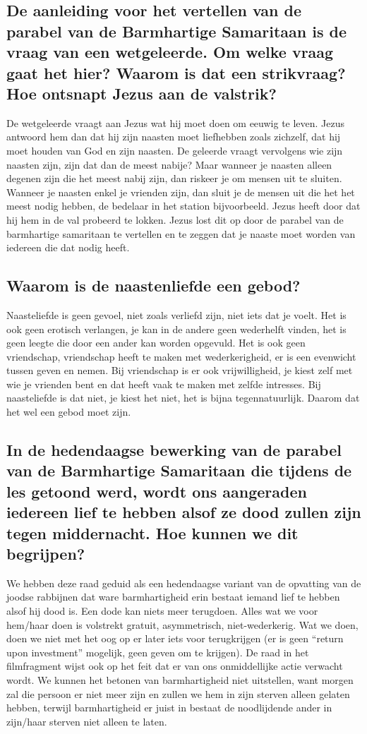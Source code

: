 \documentclass[11pt,a4paper,titlepage]{article}
\begin{document}
\subsection{De aanleiding voor het vertellen van de parabel van de Barmhartige Samaritaan is de vraag van een wetgeleerde. Om welke vraag gaat het hier? Waarom is dat een strikvraag? Hoe ontsnapt Jezus aan de valstrik?}
De wetgeleerde vraagt aan Jezus wat hij moet doen om eeuwig te leven. Jezus antwoord hem dan dat hij zijn naasten moet liefhebben zoals zichzelf, dat hij moet houden van God en zijn naasten. De geleerde vraagt vervolgens wie zijn naasten zijn, zijn dat dan de meest nabije? Maar wanneer je naasten alleen degenen zijn die het meest nabij zijn, dan riskeer je om mensen uit te sluiten. Wanneer je naasten enkel je vrienden zijn, dan sluit je de mensen uit die het het meest nodig hebben, de bedelaar in het station bijvoorbeeld. Jezus heeft door dat hij hem in de val probeerd te lokken. Jezus lost dit op door de parabel van de barmhartige samaritaan te vertellen en te zeggen dat je naaste moet worden van iedereen die dat nodig heeft.

\subsection{Waarom is de naastenliefde een gebod?}
Naasteliefde is geen gevoel, niet zoals verliefd zijn, niet iets dat je voelt. Het is ook geen erotisch verlangen, je kan in de andere geen wederhelft vinden, het is geen leegte die door een ander kan worden opgevuld. Het is ook geen vriendschap, vriendschap heeft te maken met wederkerigheid, er is een evenwicht tussen geven en nemen. Bij vriendschap is er ook vrijwilligheid, je kiest zelf met wie je vrienden bent en dat heeft vaak te maken met zelfde intresses. Bij naasteliefde is dat niet, je kiest het niet, het is bijna tegennatuurlijk. Daarom dat het wel een gebod moet zijn.

\subsection{In de hedendaagse bewerking van de parabel van de Barmhartige Samaritaan die tijdens de les getoond werd, wordt ons aangeraden iedereen lief te hebben alsof ze dood zullen zijn tegen middernacht. Hoe kunnen we dit begrijpen?}
We hebben deze raad geduid als een hedendaagse variant van de opvatting van de joodse rabbijnen dat ware barmhartigheid erin bestaat iemand lief te hebben alsof hij dood is. Een dode kan niets meer terugdoen. Alles wat we voor hem/haar doen is volstrekt gratuit, asymmetrisch, niet-wederkerig. Wat we doen, doen we niet met het oog op er later iets voor terugkrijgen (er is geen “return upon investment” mogelijk, geen geven om te krijgen). De raad in het filmfragment wijst ook op het feit dat er van ons onmiddellijke actie verwacht wordt. We kunnen het betonen van barmhartigheid niet uitstellen, want morgen zal die persoon er niet
meer zijn en zullen we hem in zijn sterven alleen gelaten hebben, terwijl barmhartigheid er juist in bestaat de noodlijdende ander in zijn/haar sterven niet alleen te laten.
\end{document}
